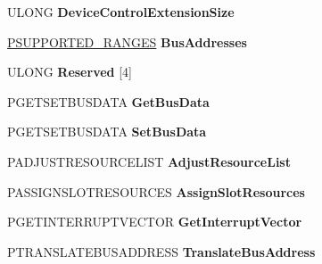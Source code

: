 \begin{DoxyCompactItemize}
\item 
\mbox{\label{struct___b_u_s___h_a_n_d_l_e_r_a8577471f57660473027a03eef57e8d97}} 
U\+L\+O\+NG {\bfseries Device\+Control\+Extension\+Size}
\item 
\mbox{\label{struct___b_u_s___h_a_n_d_l_e_r_a2fd34f64f2e1c52c1e7df68a442bc8a6}} 
\hyperlink{struct___s_u_p_p_o_r_t_e_d___r_a_n_g_e_s}{P\+S\+U\+P\+P\+O\+R\+T\+E\+D\+\_\+\+R\+A\+N\+G\+ES} {\bfseries Bus\+Addresses}
\item 
\mbox{\label{struct___b_u_s___h_a_n_d_l_e_r_a24a6fa053b7701b75ce6fe465b89dd11}} 
U\+L\+O\+NG {\bfseries Reserved} \mbox{[}4\mbox{]}
\item 
\mbox{\label{struct___b_u_s___h_a_n_d_l_e_r_a0624547e89ec938df5cd5708e7449b2b}} 
P\+G\+E\+T\+S\+E\+T\+B\+U\+S\+D\+A\+TA {\bfseries Get\+Bus\+Data}
\item 
\mbox{\label{struct___b_u_s___h_a_n_d_l_e_r_adc1019eee5bac1446fd6c3a02b5e55cf}} 
P\+G\+E\+T\+S\+E\+T\+B\+U\+S\+D\+A\+TA {\bfseries Set\+Bus\+Data}
\item 
\mbox{\label{struct___b_u_s___h_a_n_d_l_e_r_aee04be154959bb9d3b820c6d764d8b6a}} 
P\+A\+D\+J\+U\+S\+T\+R\+E\+S\+O\+U\+R\+C\+E\+L\+I\+ST {\bfseries Adjust\+Resource\+List}
\item 
\mbox{\label{struct___b_u_s___h_a_n_d_l_e_r_a5a2f6186a597df99c07b187d8b462ea4}} 
P\+A\+S\+S\+I\+G\+N\+S\+L\+O\+T\+R\+E\+S\+O\+U\+R\+C\+ES {\bfseries Assign\+Slot\+Resources}
\item 
\mbox{\label{struct___b_u_s___h_a_n_d_l_e_r_a05d7698d9ed6692a678f646c9397068c}} 
P\+G\+E\+T\+I\+N\+T\+E\+R\+R\+U\+P\+T\+V\+E\+C\+T\+OR {\bfseries Get\+Interrupt\+Vector}
\item 
\mbox{\label{struct___b_u_s___h_a_n_d_l_e_r_a55d0339cac02682395b7aa0592a8d4b5}} 
P\+T\+R\+A\+N\+S\+L\+A\+T\+E\+B\+U\+S\+A\+D\+D\+R\+E\+SS {\bfseries Translate\+Bus\+Address}
\item 

\end{DoxyCompactItemize}
